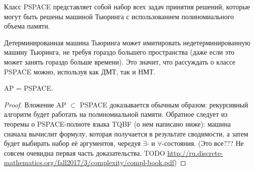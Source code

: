     
    \begin{Def}
        Класс PSPACE представляет собой набор всех задач принятия решений, которые могут быть решены машиной Тьюринга с использованием полиномиального объема памяти.
    \end{Def}
    \begin{Rem}
        Детерминированная машина Тьюринга может имитировать недетерминированную машину Тьюринга, не требуя гораздо большего пространства (даже если это может занять гораздо больше времени). Это значит, что рассуждать о классе PSPACE можно, используя как ДМТ, так и НМТ.
    \end{Rem}
    \begin{Thm}
        AP = PSPACE.
    \end{Thm}
    \begin{proof}
        Вложение AP $\subset$ PSPACE доказывается обычным образом: рекурсивный алгоритм будет работать на полиномиальной памяти. Обратное следует из теоремы о PSPACE-полноте языка TQBF (о нем написано ниже): машина сначала вычислит формулу, которая получается в результате сводимости, а затем будет выбирать набор её аргументов, чередуя $\exists$- и $\forall$-состояния.
        (Это все??? Не совсем очевидна первая часть доказательства. TODO \url{http://ru.discrete-mathematics.org/fall2017/3/complexity/compl-book.pdf})
    \end{proof} 

    

